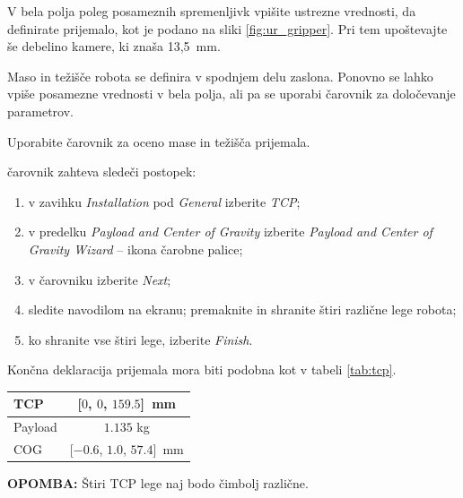 \begin{mdframed}[backgroundcolor=yellow!20, shadow=true,roundcorner=8pt]
V bela polja poleg posameznih spremenljivk vpišite ustrezne vrednosti, da definirate prijemalo, kot je podano na sliki \ref{fig:ur_gripper}. Pri tem upoštevajte še debelino kamere, ki znaša 13,5~mm.
\end{mdframed}


Maso in težišče robota se definira v spodnjem delu zaslona. Ponovno se lahko vpiše posamezne vrednosti v bela polja, ali pa se uporabi čarovnik za določevanje parametrov.

\begin{mdframed}[backgroundcolor=yellow!20, shadow=true,roundcorner=8pt]
Uporabite čarovnik za oceno mase in težišča prijemala.
\end{mdframed}

čarovnik zahteva sledeči postopek:
\begin{enumerate}
\item v zavihku \emph{Installation} pod \emph{General} izberite \emph{TCP};
\item v predelku \emph{Payload and Center of Gravity} izberite \emph{Payload and Center of Gravity Wizard} -- ikona čarobne palice;
\item v čarovniku izberite \emph{Next};
\item sledite navodilom na ekranu; premaknite in shranite štiri različne lege robota;
\item ko shranite vse štiri lege, izberite \emph{Finish}.
\end{enumerate}

Končna deklaracija prijemala mora biti podobna kot v tabeli \ref{tab:tcp}.

\begin{center}
\begin{tabular}{|l|c|}
  \hline
  TCP & [$0$, $0$, $159.5$]~mm \\
  \hline
  Payload & $1.135$ kg \\
  \hline
  COG & [$-0.6$, $1.0$, $57.4$]~mm\\
  \hline
\end{tabular}
\label{tab:tcp}
\end{center}

\begin{mdframed}[backgroundcolor=blue!20, shadow=true,roundcorner=8pt]
\textbf{OPOMBA:} Štiri TCP lege naj bodo čimbolj različne.
\end{mdframed}

